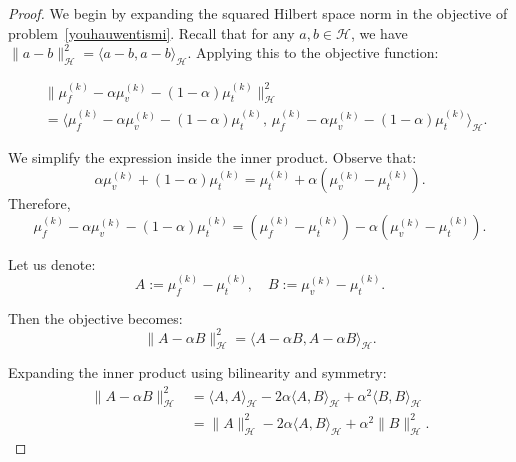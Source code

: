 \documentclass{article}
\theoremstyle{plain}
\theoremstyle{definition}
\theoremstyle{remark}
\begin{document}
\begin{proof}
We begin by expanding the squared Hilbert space norm in the objective of problem~\eqref{youhauwentismi}. Recall that for any $a, b \in \mathcal{H}$, we have $\|a - b\|_{\mathcal{H}}^2 = \langle a - b, a - b \rangle_{\mathcal{H}}$. Applying this to the objective function:

\begin{equation}
 \begin{aligned}
    &\|\mu^{(k)}_f - \alpha\mu^{(k)}_v - (1-\alpha)\mu^{(k)}_t \|_{\mathcal{H}}^2 \nonumber \\
    &= \big\langle \mu^{(k)}_f - \alpha\mu^{(k)}_v - (1-\alpha)\mu^{(k)}_t,\,
                    \mu^{(k)}_f - \alpha\mu^{(k)}_v - (1-\alpha)\mu^{(k)}_t \big\rangle_{\mathcal{H}}. \end{aligned}
\end{equation}

We simplify the expression inside the inner product. Observe that:
\begin{equation}
    \alpha\mu^{(k)}_v + (1-\alpha)\mu^{(k)}_t = \mu^{(k)}_t + \alpha(\mu^{(k)}_v - \mu^{(k)}_t).
\end{equation}
Therefore,
\begin{equation}
 \mu^{(k)}_f - \alpha\mu^{(k)}_v - (1-\alpha)\mu^{(k)}_t = (\mu^{(k)}_f - \mu^{(k)}_t) - \alpha(\mu^{(k)}_v - \mu^{(k)}_t).
\end{equation}

Let us denote:
\begin{equation}
A := \mu^{(k)}_f - \mu^{(k)}_t, \quad B := \mu^{(k)}_v - \mu^{(k)}_t.
\end{equation}

Then the objective becomes:
\begin{equation}
\|A - \alpha B\|_{\mathcal{H}}^2 = \langle A - \alpha B, A - \alpha B \rangle_{\mathcal{H}}.
\end{equation}

Expanding the inner product using bilinearity and symmetry:
\begin{equation}
\begin{aligned}
    \|A - \alpha B\|_{\mathcal{H}}^2
    &= \langle A, A \rangle_{\mathcal{H}} - 2\alpha \langle A, B \rangle_{\mathcal{H}} + \alpha^2 \langle B, B \rangle_{\mathcal{H}} \nonumber \\
    &= \|A\|_{\mathcal{H}}^2 - 2\alpha \langle A, B \rangle_{\mathcal{H}} + \alpha^2 \|B\|_{\mathcal{H}}^2.
\end{aligned}
\end{equation}


\end{proof}
\end{document}
